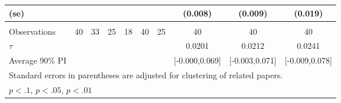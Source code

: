 \begin{table}[htbp]
\begin{tabular}{l*{9}{c}}
(se)                &                     &                     &                     &                     &                     &                     &     (0.008)         &     (0.009)         &     (0.019)         \\
\hline              &                     &                     &                     &                     &                     &                     &                     &                     &                     \\
Observations        &          40         &          33         &          25         &          18         &          40         &          25         &          40         &          40         &          40         \\
$\tau$              &                     &                     &                     &                     &                     &                     &      0.0201         &      0.0212         &      0.0241         \\
Average 90\% PI     &                     &                     &                     &                     &                     &                     &[-0.000,0.069]         &[-0.003,0.071]         &[-0.009,0.078]         \\
\hline\hline
\multicolumn{10}{l}{\footnotesize Standard errors in parentheses are adjusted for clustering of related papers.}\\
\multicolumn{10}{l}{\footnotesize \footnotesize \sym{*} \(p<.1\), \sym{**} \(p<.05\), \sym{***} \(p<.01\)}\\
\end{tabular}
\end{table}
